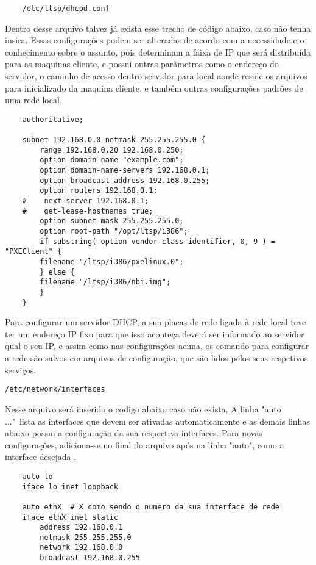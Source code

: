 \documentclass[
	12pt,				%
	openright,			%
	twoside,			%
	a4paper,			%
	chapter=TITLE,		%
	english,			%
	brazil				%
	]{abntex2}
\begin{document}
\begin{verbatim}
	/etc/ltsp/dhcpd.conf
\end{verbatim}  

Dentro desse arquivo talvez já exista esse trecho de código abaixo, caso não tenha insira. Essas configurações podem ser alteradas de acordo com a necessidade e o conhecimento sobre o assunto, pois determinam a faixa de IP que será distribuída para as maquinas cliente, e possui outras parâmetros como o endereço do servidor, o caminho de acesso dentro servidor para local aonde reside os arquivos para inicializado da maquina cliente, e também outras configurações padrões de uma rede local. 

\begin{verbatim}
	authoritative;

	subnet 192.168.0.0 netmask 255.255.255.0 {
	    range 192.168.0.20 192.168.0.250;
	    option domain-name "example.com";
	    option domain-name-servers 192.168.0.1;
	    option broadcast-address 192.168.0.255;
	    option routers 192.168.0.1;
	#    next-server 192.168.0.1;
	#    get-lease-hostnames true;
	    option subnet-mask 255.255.255.0;
	    option root-path "/opt/ltsp/i386";
	    if substring( option vendor-class-identifier, 0, 9 ) = "PXEClient" {
		filename "/ltsp/i386/pxelinux.0";
	    } else {
		filename "/ltsp/i386/nbi.img";
	    }
	}
\end{verbatim}


Para configurar um servidor DHCP, a sua placas de rede ligada à rede local teve ter um endereço IP fixo para que isso aconteça deverá ser informado ao servidor qual o seu IP, e assim como nas configurações acima, os comando para configurar a rede são salvos em arquivos de configuração, que são lidos pelos seus respctivos serviços.

\begin{verbatim}
/etc/network/interfaces
\end{verbatim} 

Nesse arquivo será inserido o codigo abaixo caso não exista, A linha "auto ..."\ lista as interfaces que devem ser ativadas automaticamente e as demais linhas abaixo possui a configuração da sua respectiva interfaces. Para novas configurações, adiciona-se  no final do arquivo após na linha "auto", como a interface desejada \cite{ClubeHardware,LTSP5}.


\begin{verbatim}
	auto lo
	iface lo inet loopback

	auto ethX  # X como sendo o numero da sua interface de rede
	iface ethX inet static
		address 192.168.0.1
		netmask 255.255.255.0
		network 192.168.0.0
		broadcast 192.168.0.255
\end{verbatim}
\end{document}
